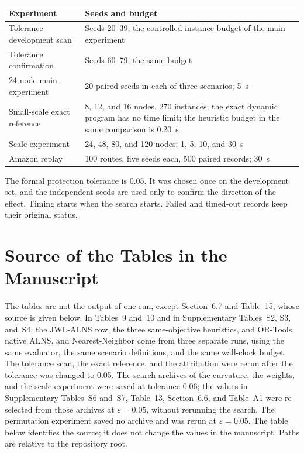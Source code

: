 \documentclass[11pt,a4paper]{article}
\begin{document}
\begin{center}
\small
\begin{tabular}{lp{8.2cm}}
\toprule
Experiment & Seeds and budget \\
\midrule
Tolerance development scan & Seeds 20--39; the controlled-instance budget of the main experiment \\
Tolerance confirmation & Seeds 60--79; the same budget \\
24-node main experiment & 20 paired seeds in each of three scenarios; 5~s \\
Small-scale exact reference & 8, 12, and 16 nodes, 270 instances; the exact dynamic program has no time limit; the heuristic budget in the same comparison is 0.20~s \\
Scale experiment & 24, 48, 80, and 120 nodes; 1, 5, 10, and 30~s \\
Amazon replay & 100 routes, five seeds each, 500 paired records; 30~s \\
\bottomrule
\end{tabular}
\end{center}

The formal protection tolerance is 0.05. It was chosen once on the development set, and the independent seeds are used only to confirm the direction of the effect. Timing starts when the search starts. Failed and timed-out records keep their original status.

\section{Source of the Tables in the Manuscript}

The tables are not the output of one run, except Section~6.7 and Table~15, whose source is given below. In Tables~9 and~10 and in Supplementary Tables~S2, S3, and~S4, the JWL-ALNS row, the three same-objective heuristics, and OR-Tools, native ALNS, and Nearest-Neighbor come from three separate runs, using the same evaluator, the same scenario definitions, and the same wall-clock budget. The tolerance scan, the exact reference, and the attribution were rerun after the tolerance was changed to 0.05. The search archives of the curvature, the weights, and the scale experiment were saved at tolerance 0.06; the values in Supplementary Tables~S6 and~S7, Table~13, Section~6.6, and Table~A1 were re-selected from those archives at $\varepsilon=0.05$, without rerunning the search. The permutation experiment saved no archive and was rerun at $\varepsilon=0.05$. The table below identifies the source; it does not change the values in the manuscript. Paths are relative to the repository root.
\end{document}
